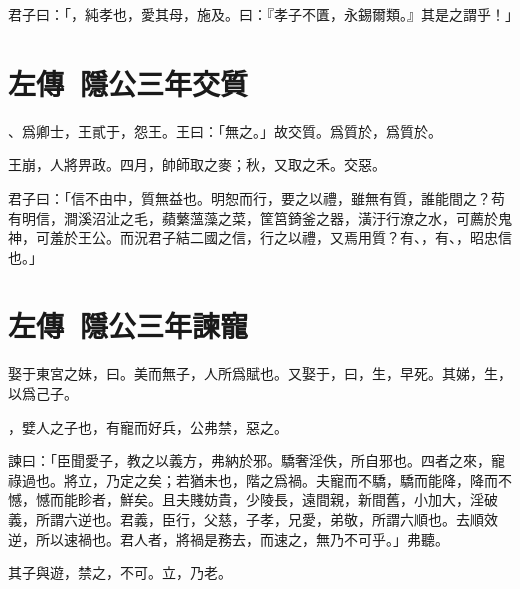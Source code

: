 君子曰：「，純孝也，愛其母，施及。曰：『孝子不匱，永錫爾類。』其是之謂乎！」

\section[周鄭交質\quad{\small 左傳\ 隱公三年}]{{\normalsize 左傳\ 隱公三年}\quad {}交質}
、爲卿士，王貳于，怨王。王曰：「無之。」故交質。爲質於，爲質於。

王崩，人將畀政。四月，帥師取之麥；秋，又取之禾。交惡。

君子曰：「信不由中，質無益也。明恕而行，要之以禮，雖無有質，誰能間之？苟有明信，澗溪沼沚之毛，蘋蘩薀藻之菜，筐筥錡釜之器，潢汙行潦之水，可薦於鬼神，可羞於王公。而況君子結二國之信，行之以禮，又焉用質？有、，有、，昭忠信也。」

\section[石碏諫寵州吁\quad{\small 左傳\ 隱公三年}]{{\normalsize 左傳\ 隱公三年}\quad {}諫寵}
娶于東宮之妹，曰。美而無子，人所爲賦也。又娶于，曰，生，早死。其娣，生，以爲己子。

，嬖人之子也，有寵而好兵，公弗禁，惡之。

諫曰：「臣聞愛子，教之以義方，弗納於邪。驕奢淫佚，所自邪也。四者之來，寵祿過也。將立，乃定之矣；若猶未也，階之爲禍。夫寵而不驕，驕而能降，降而不憾，憾而能眕者，鮮矣。且夫賤妨貴，少陵長，遠間親，新間舊，小加大，淫破義，所謂六逆也。君義，臣行，父慈，子孝，兄愛，弟敬，所謂六順也。去順效逆，所以速禍也。君人者，將禍是務去，而速之，無乃不可乎。」弗聽。

其子與遊，禁之，不可。立，乃老。

